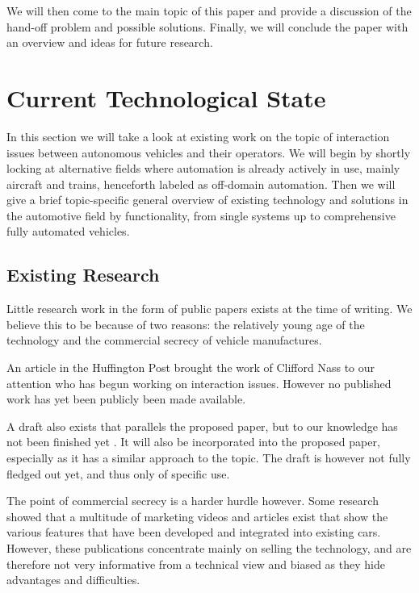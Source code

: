 \documentclass{acm_proc_article-sp}
\begin{document}
We will then come to the main topic of this paper and provide a discussion of the hand-off problem and possible solutions.
Finally, we will conclude the paper with an overview and ideas for future research.

\section{Current Technological State}

In this section we will take a look at existing work on the topic of interaction issues between autonomous vehicles and their operators.
We will begin by shortly locking at alternative fields where automation is already actively in use, mainly aircraft and trains, henceforth labeled as off-domain automation.
Then we will give a brief topic-specific general overview of existing technology and solutions in the automotive field by functionality, from single systems up to comprehensive fully automated vehicles.

\subsection{Existing Research}

Little research work in the form of public papers exists at the time of writing.
We believe this to be because of two reasons: the relatively young age of the technology and the commercial secrecy of vehicle manufactures.

An article in the Huffington Post \cite{www:huffington_post} brought the work of Clifford Nass to our attention who has begun working on interaction issues.
However no published work has yet been publicly been made available.

A draft also exists that parallels the proposed paper, but to our knowledge has not been finished yet \cite{cummings:authority}.
It will also be incorporated into the proposed paper, especially as it has a similar approach to the topic.
The draft is however not fully fledged out yet, and thus only of specific use.

The point of commercial secrecy is a harder hurdle however.
Some research showed that a multitude of marketing videos and articles exist that show the various features that have been developed and integrated into existing cars.
However, these publications concentrate mainly on selling the technology, and are therefore not very informative from a technical view and biased as they hide advantages and difficulties.
\end{document}
